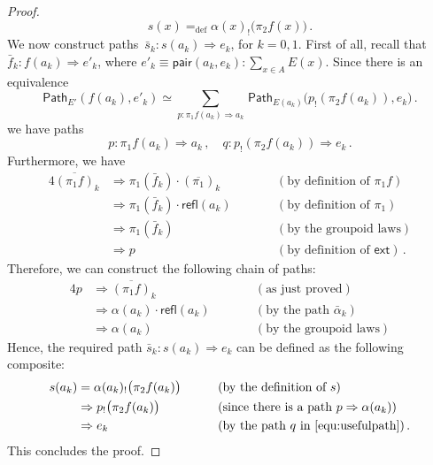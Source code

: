 \documentclass[10pt,a4paper,oneside,reqno]{amsart}
\numberwithin{equation}{section}
\theoremstyle{mythm}
\theoremstyle{mydef}
\theoremstyle{myrmk}
\newcommand{\deq}{=}
\newcommand{\defeq}{=_{\mathrm{def}}}
\newcommand{\co}{\colon}
\newcommand{\ct}{\cdot}
\newcommand{\ext}{\mathsf{ext}}
\newcommand{\pair}{\mathsf{pair}}
\newcommand{\Id}{\mathsf{Path}}
\newcommand{\refl}{\mathsf{refl}}
\begin{document}
\begin{proof}
\begin{equation}
\label{equ:defreqsection}
s(x) \defeq \alpha(x)_{!} \big( \pi_2 f (x) \big) \, .
\end{equation}
We now construct  paths~$\bar{s}_k \co s(a_k) \Rightarrow e_k$, for $k = 0, 1$. First of all, recall that 
$\bar{f}_k \co  f(a_k) \Rightarrow  e'_k$, where $e'_k \equiv \pair(a_k, e_k) \co \sum_{x \in A} E(x)$. Since there is an equivalence
\[
 \Id_{E'}( f(a_k), e'_k) \simeq  \sum_{p \co  \pi_1 f(a_k) \Rightarrow a_k} \, \Id_{E(a_k)} \big( p_{!}( \pi_2 f(a_k)) , e_k \big) \, .
\]
we have paths 
\begin{equation}
\label{equ:usefulpath}
p \co   \pi_1 f (a_k) \Rightarrow a_k  \, , \quad q \co   p_{!}( \pi_2 f (a_k)) \Rightarrow e_k   \, .
\end{equation}
Furthermore, we have 
\begin{alignat*}{4}  
\overline{(\pi_1 f)}_k  & \Rightarrow \pi_1(\bar{f}_k) \ct (\overline{\pi_1})_k & & \qquad (\text{by definition of } \pi_1 f)   \\
& \Rightarrow \pi_1(\bar{f}_k) \ct \refl(a_k) & & \qquad (\text{by definition of } \pi_1)  \\
 & \Rightarrow \pi_1(\bar{f}_k) & & \qquad (\text{by the groupoid laws}) \\
 & \Rightarrow p  & & \qquad (\text{by definition of } \ext) \,  .
\end{alignat*}
Therefore, we can construct the following chain of paths:
\begin{alignat*}{4}
p & \Rightarrow  \overline{(\pi_1 f)}_k & &  \qquad (\text{as just proved})  \\
  & \Rightarrow  \alpha(a_k) \ct \refl(a_k) & &  \qquad (\text{by the path } \bar{\alpha}_k ) \\ 
  & \Rightarrow  \alpha(a_k)  & & \qquad (\text{by the groupoid laws})
\end{alignat*} 
Hence,  the required path $\bar{s}_k \co  s(a_k) \Rightarrow e_k$ can be defined as the following composite:
\begin{alignat*}{4}
s(a_k) & \deq \alpha(a_k)_{!} \big( \pi_2 f(a_k)  \big) & & \qquad (\text{by the definition of } s) \\
 &              \Rightarrow   p_{!} \big( \pi_2 f(a_k)  \big) & & \qquad (\text{since there is a path } p \Rightarrow \alpha(a_k)) \\
   &            \Rightarrow  e_k  & &  \qquad (\text{by the path } q \text{ in } \eqref{equ:usefulpath})  \, .
   \end{alignat*} 
   This concludes the proof.
\end{proof}
\end{document}

